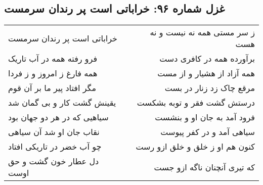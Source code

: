 \begin{center}
\section*{غزل شماره ۹۶: خراباتی است پر رندان سرمست}
\label{sec:096}
\begin{longtable}{l p{0.5cm} r}
خراباتی است پر رندان سرمست
&&
ز سر مستی همه نه نیست و نه هست
\\
فرو رفته همه در آب تاریک
&&
برآورده همه در کافری دست
\\
همه فارغ ز امروز و ز فردا
&&
همه آزاد از هشیار و از مست
\\
مگر افتاد پیر ما بر آن قوم
&&
مرقع چاک زد زنار در بست
\\
یقینش گشت کار و بی گمان شد
&&
درستش گشت فقر و توبه بشکست
\\
سیاهیی که در هر دو جهان بود
&&
فرود آمد به جان او و بنشست
\\
نقاب جان او شد آن سیاهی
&&
سیاهی آمد و در کفر پیوست
\\
چو آب خضر در تاریکی افتاد
&&
کنون هم او ز خلق و خلق ازو رست
\\
دل عطار خون گشت و حق اوست
&&
که تیری آنچنان ناگه ازو جست
\\
\end{longtable}
\end{center}
